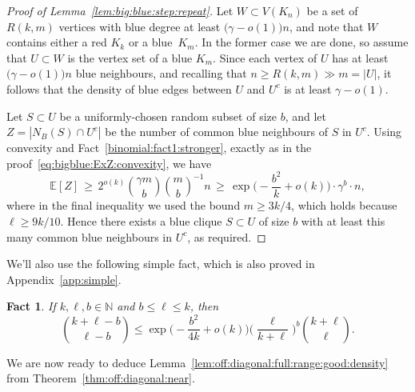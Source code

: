 \documentclass[12pt,reqno]{amsart}
\newtheorem{fact}[theorem]{Fact}
\theoremstyle{definition}
\theoremstyle{remark}
\newcommand\N{\mathbb{N}}
\newcommand\Ex{\mathbb{E}}
\renewcommand{\le}{\leqslant}
\renewcommand{\ge}{\geqslant}
\def\N{\mathbb{N}}
\begin{document}
\begin{proof}[Proof of Lemma~\ref{lem:big:blue:step:repeat}]
Let $W \subset V(K_n)$ be a set of $R(k,m)$ vertices with blue degree at least $\big( \gamma - o(1) \big)  n$, and note that $W$ contains either a red $K_k$ or a blue~$K_m$. In the former case we are done, so assume that $U \subset W$ is the vertex set of a blue $K_m$. Since each vertex of $U$ has at least $\big( \gamma - o(1) \big) n$ blue neighbours, and recalling that $n \ge R(k,m) \gg m = |U|$, it follows that the density of blue edges between $U$ and $U^c$ is at least $\gamma - o(1)$. %

Let $S \subset U$ be a uniformly-chosen random subset of size $b$, and let $Z = |N_B(S) \cap U^c|$ be the number of common blue neighbours of $S$ in $U^c$. Using convexity and Fact~\ref{binomial:fact1:stronger}, exactly as in the proof~\eqref{eq:bigblue:ExZ:convexity}, we have
$$\Ex[Z] \,\ge\,  2^{o(k)} {\gamma m \choose b} {m \choose b}^{-1} n \, \ge \, \exp\bigg( - \frac{b^2}{k} + o(k) \bigg) \cdot \gamma^b \cdot n,$$
where in the final inequality we used the bound $m \ge 3k/4$, which holds because $\ell \ge 9k/10$. %
Hence there exists a blue clique $S \subset U$ of size $b$ with at least this many common blue neighbours in $U^c$, as required. %
\end{proof}


We'll also use the following simple fact, which is also proved in Appendix~\ref{app:simple}.

\begin{fact}\label{final:fact}
If $k,\ell,b \in \N$ and $b \le \ell \le k$, then %
$${k + \ell - b \choose \ell - b} \le \exp\bigg( - \frac{b^2}{4k} + o(k) \bigg) \bigg( \frac{\ell}{k + \ell} \bigg)^b {k + \ell \choose \ell}.$$ 
\end{fact}

We are now ready to deduce Lemma~\ref{lem:off:diagonal:full:range:good:density} from Theorem~\ref{thm:off:diagonal:near}. 
\end{document}
